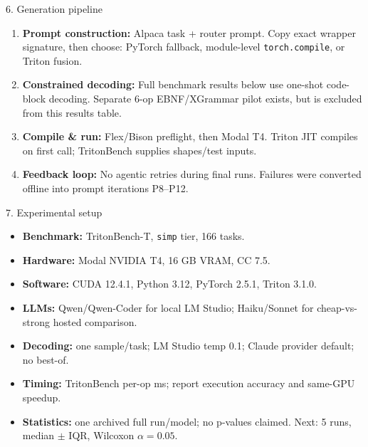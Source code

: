 \begin{block}{6. Generation pipeline}
\begin{enumerate}
  \item \textbf{Prompt construction:} Alpaca task + router prompt. Copy exact wrapper signature, then choose: PyTorch fallback, module-level \texttt{torch.compile}, or Triton fusion.
  \item \textbf{Constrained decoding:} Full benchmark results below use one-shot code-block decoding. Separate 6-op EBNF/XGrammar pilot exists, but is excluded from this results table.
  \item \textbf{Compile \& run:} Flex/Bison preflight, then Modal T4. Triton JIT compiles on first call; TritonBench supplies shapes/test inputs.
  \item \textbf{Feedback loop:} No agentic retries during final runs. Failures were converted offline into prompt iterations P8--P12.
\end{enumerate}
\end{block}

\begin{exampleblock}{7. Experimental setup}
\begin{itemize}
  \item \textbf{Benchmark:} TritonBench-T, \texttt{simp} tier, 166 tasks.
  \item \textbf{Hardware:} Modal NVIDIA T4, 16 GB VRAM, CC 7.5.
  \item \textbf{Software:} CUDA 12.4.1, Python 3.12, PyTorch 2.5.1, Triton 3.1.0.
  \item \textbf{LLMs:} Qwen/Qwen-Coder for local LM Studio; Haiku/Sonnet for cheap-vs-strong hosted comparison.
  \item \textbf{Decoding:} one sample/task; LM Studio temp 0.1; Claude provider default; no best-of.
  \item \textbf{Timing:} TritonBench per-op ms; report execution accuracy and same-GPU speedup.
  \item \textbf{Statistics:} one archived full run/model; no p-values claimed. Next: 5 runs, median $\pm$ IQR, Wilcoxon $\alpha=0.05$.
\end{itemize}
\end{exampleblock}


